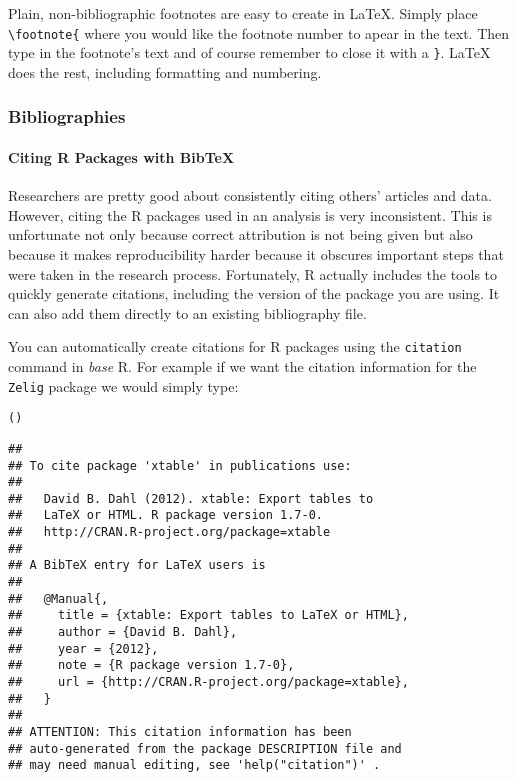 Plain, non-bibliographic footnotes are easy to create in LaTeX. Simply place \texttt{\textbackslash{}footnote\{} where you would like the footnote number to apear in the text. Then type in the footnote's text and of course remember to close it with a \texttt{\}}. LaTeX does the rest, including formatting and numbering.

\subsubsection{Bibliographies}

\paragraph{Citing R Packages with BibTeX}

Researchers are pretty good about consistently citing others' articles and data. However, citing the R packages used in an analysis is very inconsistent. This is unfortunate not only because correct attribution is not being given but also because it makes reproducibility harder because it obscures important steps that were taken in the
research process. Fortunately, R actually includes the tools to quickly generate citations, including the version of the package you are using. It can also add them directly to an existing bibliography file.

You can automatically create citations for R packages using the \texttt{citation} command in \emph{base} R. For example if we want the citation information for the \texttt{Zelig} package we would simply type:

\begin{knitrout}
\color{fgcolor}\begin{kframe}
\begin{alltt}
()
\end{alltt}
\begin{verbatim}
## 
## To cite package 'xtable' in publications use:
## 
##   David B. Dahl (2012). xtable: Export tables to
##   LaTeX or HTML. R package version 1.7-0.
##   http://CRAN.R-project.org/package=xtable
## 
## A BibTeX entry for LaTeX users is
## 
##   @Manual{,
##     title = {xtable: Export tables to LaTeX or HTML},
##     author = {David B. Dahl},
##     year = {2012},
##     note = {R package version 1.7-0},
##     url = {http://CRAN.R-project.org/package=xtable},
##   }
## 
## ATTENTION: This citation information has been
## auto-generated from the package DESCRIPTION file and
## may need manual editing, see 'help("citation")' .
\end{verbatim}
\end{kframe}
\end{knitrout}


